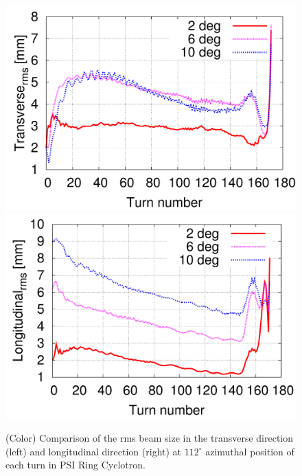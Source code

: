 \documentclass[aps,prstab,onecolumn,superscriptaddress,showpacs]{revtex4}
\begin{document}
\begin{figure}
  \includegraphics[width=0.45\linewidth]{figures/Comp-Transverse.pdf}
  \includegraphics[width=0.45\linewidth]{figures/Comp-Longitudinal.pdf}
  \caption{(Color) Comparison of the rms beam size in the transverse direction (left) and longitudinal direction (right) at $112^\circ$ azimuthal position of each turn 
    in PSI Ring Cyclotron. }
  \label{fig:RMSsize}
\end{figure}
\end{document}
